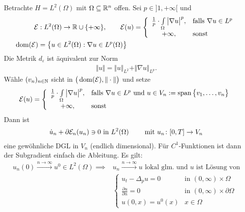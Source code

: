 \begin{beispiel}
	 Betrachte $H=L^2(\Omega)$ mit $\Omega\subseteq\mathbb{R}^n$ offen.
	 Sei $p\in]1,+\infty[$ und 
	 \begin{align*}
	 	\mathcal{E}&:L^2(\Omega)\to\mathbb{R}\cup\lbrace+\infty\rbrace,\qquad
	 	\mathcal{E}(u)=\left\lbrace\begin{array}{cl}
	 		\frac{1}{p}\cdot\int\limits_\Omega\big|\nabla u\big|^p, &\text{falls } \nabla u\in L^p\\
	 		+\infty, &\text{sonst }
	 	\end{array}\right.\\
	 	\operatorname{dom}(\mathcal{E})&=\left\lbrace u\in L^2(\Omega):\nabla u\in L^p(\Omega)\right\rbrace
	 \end{align*}
	 Die Metrik $d_\varepsilon$ ist äquivalent zur Norm
	 \begin{align*}
	 	\Vert u\Vert=\Vert u\Vert_{L^2}+\Vert\nabla u\Vert_{L^p}.
	 \end{align*}
	 Wähle $(v_n)_{n\in\mathbb{N}}$ sicht in $\big(\operatorname{dom}(\mathcal{E}),\Vert\cdot\Vert\big)$ und setze
	 \begin{align*}
	 	\mathcal{E}(u)=\left\lbrace\begin{array}{cl}
	 		\frac{1}{p}\cdot\int\limits_\Omega\big|\nabla u\big|^p , &\text{falls } \nabla u\in L^p\text{ und }u\in V_n:=\operatorname{span}\big\lbrace v_1,\ldots,v_n\big\rbrace\\
	 		+\infty, &\text{sonst }
	 	\end{array}\right.
	 \end{align*}
	 Dann ist
	 \begin{align*}
	 	\dot{u}_n+\partial\mathcal{E}_n(u_n)\ni 0\text{ in }L^2(\Omega)
	 	\qquad\text{ mit } u_n\colon [0,T]\to V_n
	 \end{align*}
	 eine gewöhnliche DGL in $V_n$ (endlich dimensional). Für $C^1$-Funktionen ist dann der Subgradient einfach die Ableitung.
	 Es gilt:
	 \begin{align*}
	 	u_n(0)\overset{n\to\infty}{\longrightarrow}u^0\in L^2(\Omega)
	 	\implies &u_n\overset{n\to\infty}{\longrightarrow} u\text{ lokal glm. und $u$ ist Lösung von}\\
	 	&\left\lbrace\begin{array}{cl}
	 		u_t-\Delta_p u =0 &\text{in }(0,\infty)\times\Omega\\
	 		\frac{\partial u}{\partial n}=0 &\text{in }(0,\infty)\times\partial\Omega\\
	 		u(0,x)=u^0(x) &x\in\Omega
	 	\end{array}\right.
	 \end{align*}
\end{beispiel}



